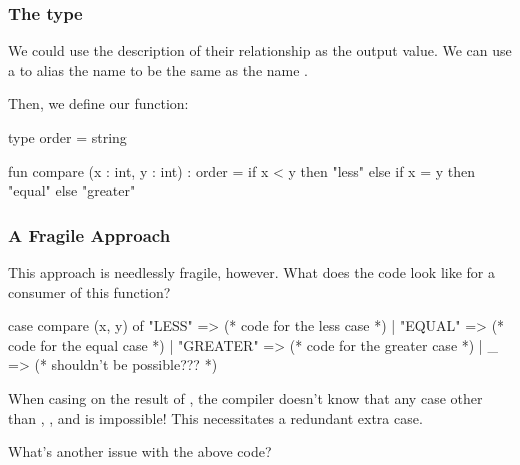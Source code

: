 \documentclass[aspectratio=169]{beamer}
\begin{document}
\begin{frame}[fragile]
  \frametitle{The  type}

  We could use the description of their relationship as the output value.
  We can use a  to alias the name  to be the
  same as the name .

  \pause
  \vspace{\fill}

  Then, we define our  function:

  \vspace{\fill}

  \begin{codeblock}
    type order = string

    fun compare (x : int, y : int) : order =
      if x < y then
        "less"
      else if x = y then
        "equal"
      else
        "greater"
  \end{codeblock}
\end{frame}

\begin{frame}[fragile]
  \frametitle{A Fragile Approach}

  This approach is needlessly fragile, however. What does the code look like
  for a consumer of this function?

  \pause
  \vspace{\fill}

  \begin{codeblock}
    case compare (x, y) of
      "LESS" => (* code for the less case *)
    | "EQUAL" => (* code for the equal case *)
    | "GREATER" => (* code for the greater case *)
    | _ => (* shouldn't be possible??? *)
  \end{codeblock}

  \pause
  \vspace{\fill}

  When casing on the result of , the compiler doesn't know that
  any case other than , , and  is
  impossible! This necessitates a redundant extra case.

  \pause
  \vspace{\fill}

  What's another issue with the above code?

\end{frame}
\end{document}

